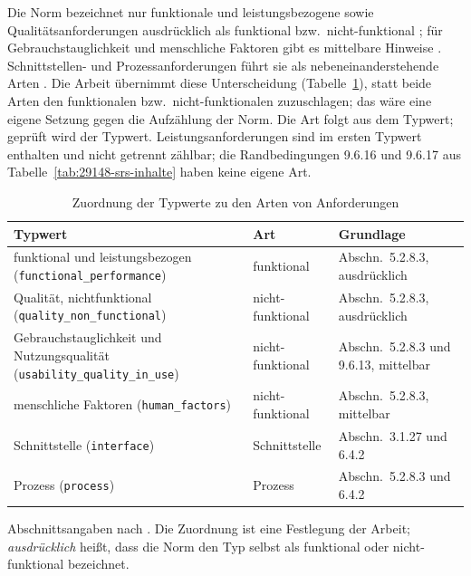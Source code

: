\documentclass[11pt,a4paper]{report}
\begin{document}
Die Norm bezeichnet nur funktionale und leistungsbezogene sowie
Qualitätsanforderungen ausdrücklich als funktional bzw.\
nicht-funktional \cite[Abschn.~5.2.8.3]{iso29148}; für
Gebrauchstauglichkeit und menschliche Faktoren gibt es mittelbare
Hinweise \cite[Abschn.~5.2.8.3, 9.6.13]{iso29148}. Schnittstellen- und
Prozessanforderungen führt sie als nebeneinanderstehende Arten
\cite[Abschn.~3.1.27 und 6.4.2]{iso29148}. Die Arbeit übernimmt diese
Unterscheidung (Tabelle~\ref{tab:typ-arten}), statt beide Arten den
funktionalen bzw.\ nicht-funktionalen zuzuschlagen; das wäre eine
eigene Setzung gegen die Aufzählung der Norm. Die Art folgt aus dem
Typwert; geprüft wird der Typwert. Leistungsanforderungen sind im
ersten Typwert enthalten und nicht getrennt zählbar; die Randbedingungen
9.6.16 und 9.6.17 aus Tabelle~\ref{tab:29148-srs-inhalte} haben keine
eigene Art.

\begin{table}[htbp]
  \centering
  \caption{Zuordnung der Typwerte zu den Arten von Anforderungen}
  \label{tab:typ-arten}
  \begin{tabular}{@{}>{\raggedright\arraybackslash}p{5.9cm}%
                    >{\raggedright\arraybackslash}p{2.6cm}%
                    >{\raggedright\arraybackslash}p{4.3cm}@{}}
    \toprule
    \textbf{Typwert} & \textbf{Art} & \textbf{Grundlage} \\
    \midrule
    funktional und leistungsbezogen
      (\texttt{functional\_performance}) & funktional &
      Abschn.~5.2.8.3, ausdrücklich \\
    Qualität, nichtfunktional
      (\texttt{quality\_non\_functional}) & nicht-funktional &
      Abschn.~5.2.8.3, ausdrücklich \\
    Gebrauchstauglichkeit und Nutzungsqualität
      (\texttt{usability\_quality\_in\_use}) & nicht-funktional &
      Abschn.~5.2.8.3 und 9.6.13, mittelbar \\
    menschliche Faktoren (\texttt{human\_factors}) & nicht-funktional &
      Abschn.~5.2.8.3, mittelbar \\
    Schnittstelle (\texttt{interface}) & Schnittstelle &
      Abschn.~3.1.27 und 6.4.2 \\
    Prozess (\texttt{process}) & Prozess &
      Abschn.~5.2.8.3 und 6.4.2 \\
    \bottomrule
  \end{tabular}

  \vspace{0.5em}
  \footnotesize\raggedright
  Abschnittsangaben nach \cite{iso29148}. Die Zuordnung ist eine
  Festlegung der Arbeit; \emph{ausdrücklich} heißt, dass die Norm den
  Typ selbst als funktional oder nicht-funktional bezeichnet.
\end{table}
\end{document}
